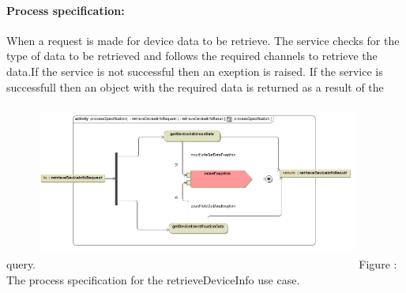 \documentclass[hidelinks, 12pt, oneside]{article}
\begin{document}
		\paragraph{Process specification:}
		When a request is made for device data to be retrieve. The service checks for the type of data to 			be retrieved and follows the required channels to retrieve the data.If the service is not 					successful then an exeption is raised. If the service is successfull then an object with the 				required data is returned as a result of the query.\newline\newline
		\includegraphics[width=400px,height=220px]{img/processSpecificationRetrieveDeviceInfo.jpg}
		Figure : The process specification for the retrieveDeviceInfo use case.
		
\end{document}
